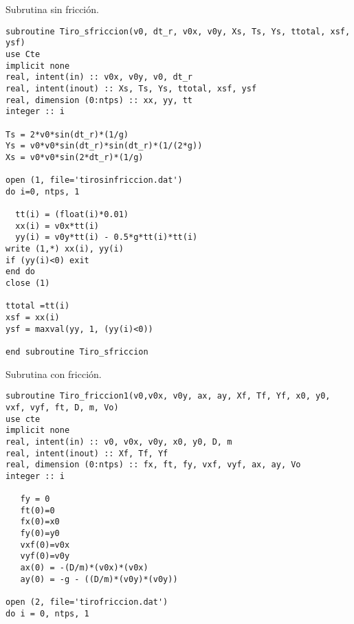 \documentclass[12pt]{article}
\begin{document}
\begin{large}
Subrutina sin fricción.
\end{large}
\begin{verbatim}
subroutine Tiro_sfriccion(v0, dt_r, v0x, v0y, Xs, Ts, Ys, ttotal, xsf, ysf)
use Cte
implicit none
real, intent(in) :: v0x, v0y, v0, dt_r
real, intent(inout) :: Xs, Ts, Ys, ttotal, xsf, ysf
real, dimension (0:ntps) :: xx, yy, tt
integer :: i

Ts = 2*v0*sin(dt_r)*(1/g)
Ys = v0*v0*sin(dt_r)*sin(dt_r)*(1/(2*g))
Xs = v0*v0*sin(2*dt_r)*(1/g)

open (1, file='tirosinfriccion.dat')
do i=0, ntps, 1
  
  tt(i) = (float(i)*0.01)
  xx(i) = v0x*tt(i) 
  yy(i) = v0y*tt(i) - 0.5*g*tt(i)*tt(i)
write (1,*) xx(i), yy(i)
if (yy(i)<0) exit
end do
close (1)

ttotal =tt(i)
xsf = xx(i)
ysf = maxval(yy, 1, (yy(i)<0))

end subroutine Tiro_sfriccion
\end{verbatim}

\begin{large}
Subrutina con fricción.
\end{large}
\begin{verbatim}
subroutine Tiro_friccion1(v0,v0x, v0y, ax, ay, Xf, Tf, Yf, x0, y0, vxf, vyf, ft, D, m, Vo) 
use cte
implicit none
real, intent(in) :: v0, v0x, v0y, x0, y0, D, m
real, intent(inout) :: Xf, Tf, Yf
real, dimension (0:ntps) :: fx, ft, fy, vxf, vyf, ax, ay, Vo
integer :: i
   
   fy = 0
   ft(0)=0
   fx(0)=x0
   fy(0)=y0
   vxf(0)=v0x
   vyf(0)=v0y
   ax(0) = -(D/m)*(v0x)*(v0x)
   ay(0) = -g - ((D/m)*(v0y)*(v0y))

open (2, file='tirofriccion.dat')  
do i = 0, ntps, 1
\end{verbatim}
\end{document}
